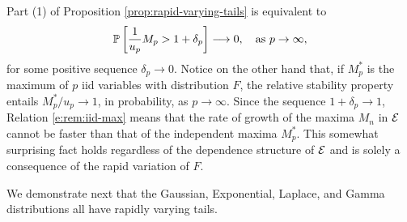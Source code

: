 \begin{remark} \label{rem:iid-max} Part (1) of Proposition \ref{prop:rapid-varying-tails} is equivalent to 
\begin{equation}\label{e:rem:iid-max}
  \P\left[\frac{1}{u_p} M_p >  1+\delta_p \right] \longrightarrow 0,\ \ \mbox{ as }p\to\infty,
\end{equation}
for some positive sequence $\delta_p\to 0$.  
Notice on the other hand that, if $M_p^*$ is the maximum of $p$ iid variables with distribution $F$,
the relative stability property entails $M_p^*/u_p \to 1$, in probability, as $p\to\infty$.  Since the sequence $1+\delta_p\to 1$, 
Relation \eqref{e:rem:iid-max} means that the rate of growth of the maxima $M_n$ in ${\cal E}$ cannot be faster than that of the independent
maxima $M_p^*$. 
This somewhat surprising fact holds regardless of the dependence structure of ${\cal E}$ and is solely a consequence of the rapid variation of $F$.
\end{remark}

We demonstrate next that the Gaussian, Exponential, Laplace, and Gamma distributions all have rapidly varying tails. 

% 

